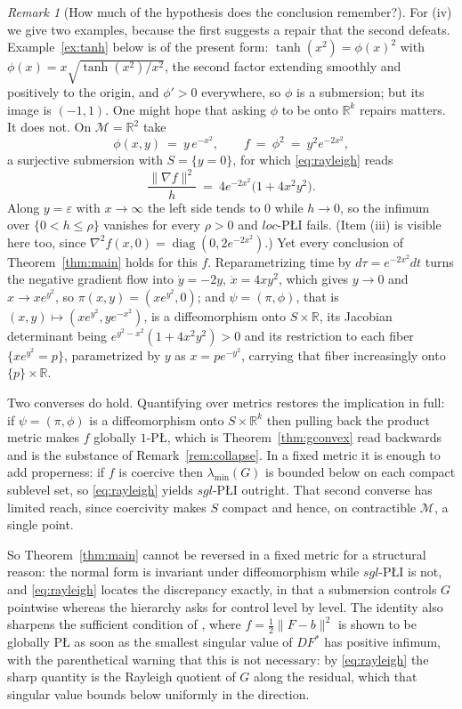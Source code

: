 \documentclass[11pt]{article}
\theoremstyle{plain}
\theoremstyle{definition}
\theoremstyle{remark}
\newtheorem{rem}[thm]{Remark}
\newcommand{\M}{\mathcal{M}}
\newcommand{\R}{\mathbb{R}}
\begin{document}
\begin{rem}[How much of the hypothesis does the conclusion remember?]
For (iv) we give two examples, because the first suggests a repair that the
second defeats. Example~\ref{ex:tanh} below is of the present form:
$\tanh(x^2) = \phi(x)^2$ with $\phi(x) = x\sqrt{\tanh(x^2)/x^2}$, the second
factor extending smoothly and positively to the origin, and $\phi'>0$
everywhere, so $\phi$ is a submersion; but its image is $(-1,1)$. One might hope
that asking $\phi$ to be onto $\R^k$ repairs matters. It does not. On $\M=\R^2$
take
\[
  \phi(x,y) \ =\ y\,e^{-x^2} , \qquad
  f \ =\ \phi^2 \ =\ y^2e^{-2x^2} ,
\]
a surjective submersion with $S = \{y=0\}$, for which \eqref{eq:rayleigh} reads
\[
  \frac{\|\nabla f\|^2}{h} \ =\ 4e^{-2x^2}\bigl(1+4x^2y^2\bigr) .
\]
Along $y=\varepsilon$ with $x\to\infty$ the left side tends to $0$ while
$h\to0$, so the infimum over $\{0<h\le\rho\}$ vanishes for every $\rho>0$ and
$loc$-P\L{}I fails. (Item (iii) is visible here too, since
$\nabla^2f(x,0) = \operatorname{diag}(0, 2e^{-2x^2})$.) Yet every conclusion of
Theorem~\ref{thm:main} holds for this $f$. Reparametrizing time by
$d\tau = e^{-2x^2}dt$ turns the negative gradient flow into
$\dot y = -2y$, $\dot x = 4xy^2$, which gives $y\to0$ and $x\to xe^{y^2}$, so
$\pi(x,y) = (xe^{y^2},0)$; and $\psi = (\pi,\phi)$, that is
$(x,y)\mapsto(xe^{y^2}, ye^{-x^2})$, is a diffeomorphism onto $S\times\R$,
its Jacobian determinant being $e^{y^2-x^2}(1+4x^2y^2)>0$ and its restriction to
each fiber $\{xe^{y^2}=p\}$, parametrized by $y$ as $x = pe^{-y^2}$, carrying
that fiber increasingly onto $\{p\}\times\R$.

Two converses do hold. Quantifying over metrics restores the implication in
full: if $\psi=(\pi,\phi)$ is a diffeomorphism onto $S\times\R^k$ then pulling
back the product metric makes $f$ globally $1$-P\L{}, which is
Theorem~\ref{thm:gconvex} read backwards and is the substance of
Remark~\ref{rem:collapse}. In a fixed metric it is enough to add properness: if
$f$ is coercive then $\lambda_{\min}(G)$ is bounded below on each compact
sublevel set, so \eqref{eq:rayleigh} yields $sgl$-P\L{}I outright. That second
converse has limited reach, since coercivity makes $S$ compact and hence, on
contractible $\M$, a single point.

So Theorem~\ref{thm:main} cannot be reversed in a fixed metric for a structural
reason: the normal form is invariant under diffeomorphism while $sgl$-P\L{}I is
not, and \eqref{eq:rayleigh} locates the discrepancy exactly, in that a
submersion controls $G$ pointwise whereas the hierarchy asks for control level by
level. The identity also sharpens the sufficient condition of
\cite[\S1.1]{BCR2026}, where $f=\tfrac12\|F-b\|^2$ is shown to be globally P\L{}
as soon as the smallest singular value of $DF^*$ has positive infimum, with the
parenthetical warning that this is not necessary: by \eqref{eq:rayleigh} the
sharp quantity is the Rayleigh quotient of $G$ along the residual, which that
singular value bounds below uniformly in the direction.
\end{rem}
\end{document}
